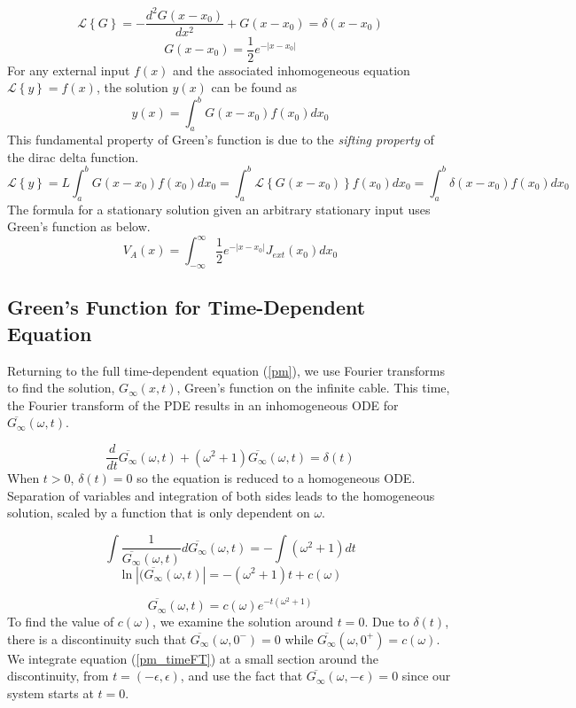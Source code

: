 \documentclass[12pt]{article}
\begin{document}
\begin{equation} \label{pm_greens}
\mathcal{L}\left\{G\right\} = -\frac{d^2{G(x-x_0)}}{d{x^2}} + G(x-x_0) = \delta(x-x_0)
\end{equation}
$$ G(x-x_0) = \frac{1}{2}e^{-| x-x_0 |} $$
For any external input $f(x)$ and the associated inhomogeneous equation $\mathcal{L}\left\{y\right\} = f(x)$, the solution $y(x)$ can be found as
$$ y(x) = \int_{a}^{b}G(x-x_0)f(x_0)dx_0 $$
This fundamental property of Green's function is due to the \textit{sifting property} of the dirac delta function. 
$$\mathcal{L}\left\{y\right\} = L\int_a^bG(x-x_0)f(x_0)dx_0 = \int_a^b\mathcal{L}\left\{G(x-x_0)\right\}f(x_0)dx_0 = \int_a^b\delta(x-x_0)f(x_0)dx_0 $$
The formula for a stationary solution given an arbitrary stationary input uses Green's function as below.
$$V_A(x) = \int_{-\infty}^{\infty}\frac{1}{2}e^{-|x-x_0|}J_{ext}(x_0)dx_0 $$

\subsection{Green's Function for Time-Dependent Equation}
Returning to the full time-dependent equation (\ref{pm}), we use Fourier transforms to find the solution, $G_{\infty}(x,t)$, Green's function on the infinite cable. This time, the Fourier transform of the PDE results in an inhomogeneous ODE for $\overline{G_{\infty}}(\omega,t)$.

\begin{equation}\label{pm_timeFT}
\frac{d}{dt}\overline{G_{\infty}}(\omega,t) + (\omega^2+1)\overline{G_{\infty}}(\omega,t) = \delta(t) 
\end{equation} 
When $t>0$, $\delta(t) = 0$ so the equation is reduced to a homogeneous ODE. Separation of variables and integration of both sides leads to the homogeneous solution, scaled by a function that is only dependent on $\omega$.

$$ \int\frac{1}{\overline{G_{\infty}}(\omega,t)}d\overline{G_{\infty}}(\omega,t) = -\int(\omega^2 + 1)dt $$
$$ \ln|(\overline{G_{\infty}}(\omega,t)| = -(\omega^2+1)t + c(\omega) $$
 
$$\overline{G_{\infty}}(\omega,t) = c(\omega)e^{-t(\omega^2+1)} $$
To find the value of $c(\omega)$, we examine the solution around $t=0$. Due to $\delta(t)$, there is a discontinuity such that $\overline{G_{\infty}}(\omega,0^-) = 0$ while $\overline{G_{\infty}}(\omega,0^+) = c(\omega)$. We integrate equation (\ref{pm_timeFT}) at a small section around the discontinuity, from $t=(-\epsilon, \epsilon)$, and use the fact that $\overline{G_{\infty}}(\omega,-\epsilon) = 0$ since our system starts at $t=0$. 
\end{document}
